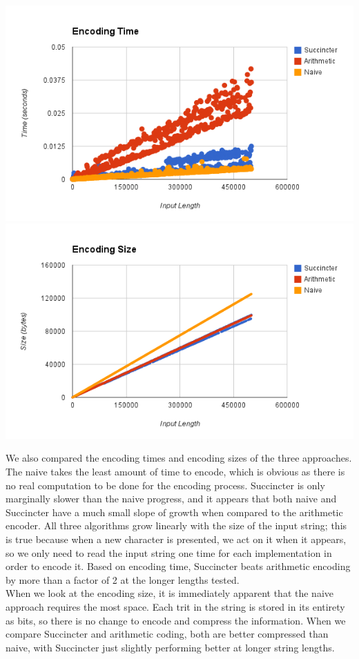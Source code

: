 \documentclass{article}
\begin{document}
\includegraphics[scale=0.4]{images/encoding_time}
\includegraphics[scale=0.4]{images/encoding_size}
\afterpage{\vfill}

We also compared the encoding times and encoding sizes of the three approaches. The naive takes the least amount of time to encode, which is obvious as there is no real computation to be done for the encoding process. Succincter is only marginally slower than the naive progress, and it appears that both naive and Succincter have a much small slope of growth when compared to the arithmetic encoder. All three algorithms grow linearly with the size of the input string; this is true because when a new character is presented, we act on it when it appears, so we only need to read the input string one time for each implementation in order to encode it. Based on encoding time, Succincter beats arithmetic encoding by more than a factor of 2 at the longer lengths tested.\\

When we look at the encoding size, it is immediately apparent that the naive approach requires the most space. Each trit in the string is stored in its entirety as bits, so there is no change to encode and compress the information. When we compare Succincter and arithmetic coding, both are better compressed than naive, with Succincter just slightly performing better at longer string lengths. \\
\end{document}
